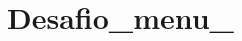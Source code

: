 \chapter{Desafio\+\_\+menu\+\_}
\hypertarget{md__r_e_a_d_m_e}{}\label{md__r_e_a_d_m_e}
\label{md__r_e_a_d_m_e_autotoc_md11}%
%
